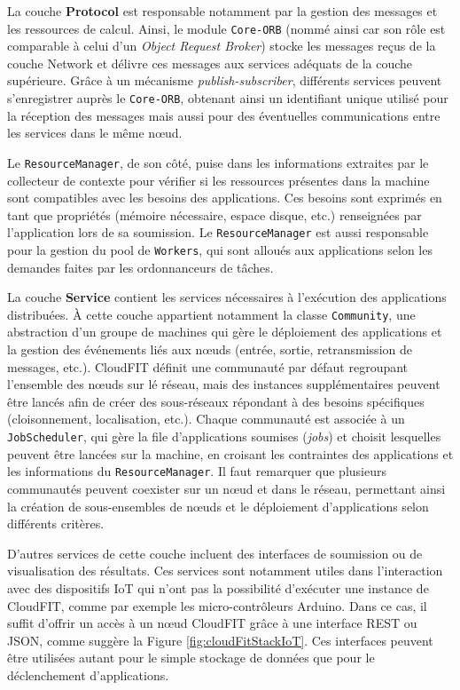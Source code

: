 La couche \textbf{Protocol} est responsable notamment par la gestion des messages et les ressources de calcul. Ainsi, le module \texttt{Core-ORB} (nommé ainsi car son rôle est comparable à celui d'un \textit{Object Request Broker}) stocke les messages reçus de la couche Network et délivre ces messages aux services adéquats de la couche supérieure. Grâce à un mécanisme \textit{publish-subscriber}, différents services peuvent s'enregistrer auprès le \texttt{Core-ORB}, obtenant ainsi un identifiant unique utilisé pour la réception des messages mais aussi pour des éventuelles communications entre les services dans le même n{\oe}ud. 

Le \texttt{ResourceManager}, de son côté, puise dans les informations extraites par le collecteur de contexte pour vérifier si les ressources présentes dans la machine sont compatibles avec les besoins des applications. Ces besoins sont exprimés en tant que propriétés (mémoire nécessaire, espace disque, etc.) renseignées par l'application lors de sa soumission. Le \texttt{ResourceManager} est aussi responsable pour la gestion du pool de \texttt{Workers}, qui sont alloués aux applications selon les demandes faites par les ordonnanceurs de tâches. 

La couche \textbf{Service}  contient les services nécessaires à l'exécution des applications distribuées. À cette couche appartient notamment la classe \texttt{Community}, une abstraction d'un groupe de machines qui gère le déploiement des applications et la gestion des événements liés aux n{\oe}uds (entrée, sortie, retransmission de messages, etc.). CloudFIT définit une communauté par défaut regroupant l'ensemble des n{\oe}uds sur lé réseau, mais des instances supplémentaires peuvent être lancés afin de créer des sous-réseaux répondant à des besoins spécifiques (cloisonnement, localisation, etc.). Chaque communauté est associée à un \texttt{JobScheduler}, qui gère la file d'applications soumises (\textit{jobs}) et choisit lesquelles peuvent être lancées sur la machine, en croisant les contraintes des applications et les informations du \texttt{ResourceManager}.  Il faut remarquer que plusieurs communautés peuvent coexister sur un n{\oe}ud et dans le réseau, permettant ainsi la création de sous-ensembles de n{\oe}uds et le déploiement d'applications selon différents critères. 

 D'autres services de cette couche incluent des interfaces de soumission ou de visualisation des résultats. Ces services sont notamment utiles dans l'interaction avec des dispositifs IoT qui n'ont pas la possibilité d'exécuter une instance de CloudFIT, comme par exemple les micro-contrôleurs Arduino. Dans ce cas, il suffit d'offrir un accès à un n{\oe}ud CloudFIT grâce à une interface REST ou JSON, comme suggère la Figure \ref{fig:cloudFitStackIoT}. Ces interfaces peuvent être utilisées autant pour le simple stockage de données que pour le déclenchement d'applications.

